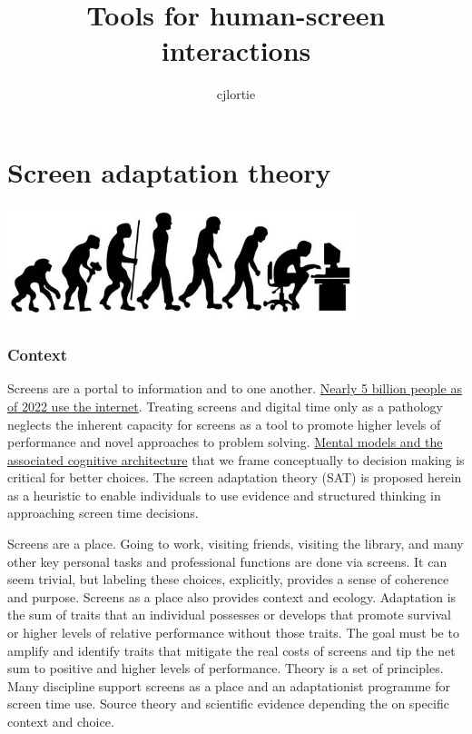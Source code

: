 \documentclass[
]{book}
\title{Tools for human-screen interactions}
\author{cjlortie}
\date{}
\begin{document}
\maketitle

{
\setcounter{tocdepth}{1}
\tableofcontents
}
\hypertarget{screen-adaptation-theory}{%
\chapter{Screen adaptation theory}\label{screen-adaptation-theory}}

\includegraphics[width=4in,height=\textheight]{./sat.png}

\hypertarget{context}{%
\subsection*{Context}\label{context}}

Screens are a portal to information and to one another. \href{https://datareportal.com/global-digital-overview}{Nearly 5 billion people as of 2022 use the internet}. Treating screens and digital time only as a pathology neglects the inherent capacity for screens as a tool to promote higher levels of performance and novel approaches to problem solving. \href{https://www.frontiersin.org/articles/10.3389/fpsyg.2017.01335/full}{Mental models and the associated cognitive architecture} that we frame conceptually to decision making is critical for better choices. The screen adaptation theory (SAT) is proposed herein as a heuristic to enable individuals to use evidence and structured thinking in approaching screen time decisions.

Screens are a place. Going to work, visiting friends, visiting the library, and many other key personal tasks and professional functions are done via screens. It can seem trivial, but labeling these choices, explicitly, provides a sense of coherence and purpose. Screens as a place also provides context and ecology. Adaptation is the sum of traits that an individual possesses or develops that promote survival or higher levels of relative performance without those traits. The goal must be to amplify and identify traits that mitigate the real costs of screens and tip the net sum to positive and higher levels of performance. Theory is a set of principles. Many discipline support screens as a place and an adaptationist programme for screen time use. Source theory and scientific evidence depending the on specific context and choice.
\end{document}

